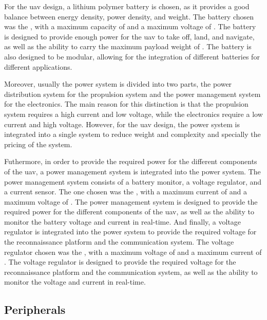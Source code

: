For the \gls{uav} design, a lithium polymer battery is chosen, as it provides a good balance between energy density, power density, and weight. The battery chosen was the , with a maximum capacity of  and a maximum voltage of . The battery is designed to provide enough power for the \gls{uav} to take off, land, and navigate, as well as the ability to carry the maximum payload weight of . The battery is also designed to be modular, allowing for the integration of different batteries for different applications.


Moreover, usually the power system is divided into two parts, the power distribution system for the propulsion system and the power management system for the electronics. The main reason for this distinction is that the propulsion system requires a high current and low voltage, while the electronics require a low current and high voltage. However, for the \gls{uav} design, the power system is integrated into a single system to reduce weight and complexity and specially the pricing of the system.

Futhermore, in order to provide the required power for the different components of the \gls{uav}, a power management system is integrated into the power system. The power management system consists of a battery monitor, a voltage regulator, and a current sensor. The one chosen was the , with a maximum current of  and a maximum voltage of . The power management system is designed to provide the required power for the different components of the \gls{uav}, as well as the ability to monitor the battery voltage and current in real-time. And finally, a voltage regulator is integrated into the power system to provide the required voltage for the reconnaissance platform and the communication system. The voltage regulator chosen was the , with a maximum voltage of  and a maximum current of . The voltage regulator is designed to provide the required voltage for the reconnaissance platform and the communication system, as well as the ability to monitor the voltage and current in real-time.


\subsection{Peripherals}

